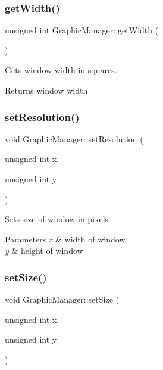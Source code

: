 \subsubsection{\texorpdfstring{get\+Width()}{getWidth()}}
{\footnotesize\ttfamily unsigned int Graphic\+Manager\+::get\+Width (\begin{DoxyParamCaption}{ }\end{DoxyParamCaption})}



Gets window width in squares. 

\begin{DoxyReturn}{Returns}
window width 
\end{DoxyReturn}
\mbox{\label{class_graphic_manager_a1ab7417cbc4168cdb00f9439ccf57e4c}} 
\subsubsection{\texorpdfstring{set\+Resolution()}{setResolution()}}
{\footnotesize\ttfamily void Graphic\+Manager\+::set\+Resolution (\begin{DoxyParamCaption}\item[{unsigned int}]{x,  }\item[{unsigned int}]{y }\end{DoxyParamCaption})}



Sets size of window in pixels. 


\begin{DoxyParams}{Parameters}
{\em x} & width of window \\
\hline
{\em y} & height of window \\
\hline
\end{DoxyParams}
\mbox{\label{class_graphic_manager_a0d177abd3a98449126938af3c076b128}} 
\subsubsection{\texorpdfstring{set\+Size()}{setSize()}}
{\footnotesize\ttfamily void Graphic\+Manager\+::set\+Size (\begin{DoxyParamCaption}\item[{unsigned int}]{x,  }\item[{unsigned int}]{y }\end{DoxyParamCaption})}



